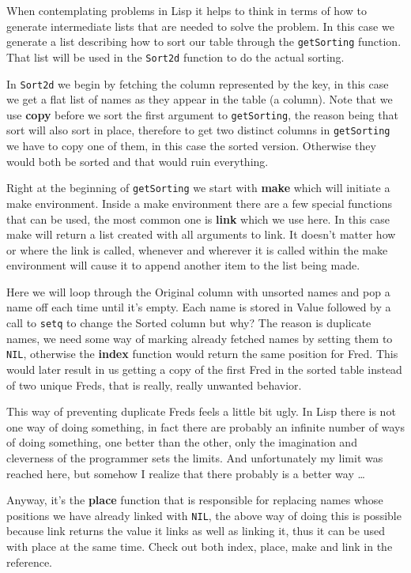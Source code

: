 When contemplating problems in Lisp it helps to think in terms of how
to generate intermediate lists that are needed to solve the problem.
In this case we generate a list describing how to sort our table
through the \texttt{getSorting} function. That list will be used in
the \texttt{Sort2d} function to do the actual sorting.

In \texttt{Sort2d} we begin by fetching the column represented by the
key, in this case we get a flat list of names as they appear in the
table (a column). Note that we use \textbf{copy} before we sort the
first argument to \texttt{getSorting}, the reason being that sort will
also sort in place, therefore to get two distinct columns in
\texttt{getSorting} we have to copy one of them, in this case the
sorted version. Otherwise they would both be sorted and that would
ruin everything.

Right at the beginning of \texttt{getSorting} we start with
\textbf{make} which will initiate a make environment. Inside a make
environment there are a few special functions that can be used, the
most common one is \textbf{link} which we use here. In this case make
will return a list created with all arguments to link. It doesn't
matter how or where the link is called, whenever and wherever it is
called within the make environment will cause it to append another
item to the list being made.

Here we will loop through the Original column with unsorted names and
pop a name off each time until it's empty. Each name is stored in
Value followed by a call to \texttt{setq} to change the Sorted column
but why? The reason is duplicate names, we need some way of marking
already fetched names by setting them to \texttt{NIL}, otherwise the
\textbf{index} function would return the same position for Fred. This
would later result in us getting a copy of the first Fred in the
sorted table instead of two unique Freds, that is really, really
unwanted behavior.

This way of preventing duplicate Freds feels a little bit ugly. In Lisp
there is not one way of doing something, in fact there are probably an
infinite number of ways of doing something, one better than the other,
only the imagination and cleverness of the programmer sets the limits.
And unfortunately my limit was reached here, but somehow I realize that
there probably is a better way \dots{}

Anyway, it's the \textbf{place} function that is responsible for replacing
names whose positions we have already linked with \texttt{NIL}, the above way of
doing this is possible because link returns the value it links as well
as linking it, thus it can be used with place at the same time. Check
out both index, place, make and link in the reference.

